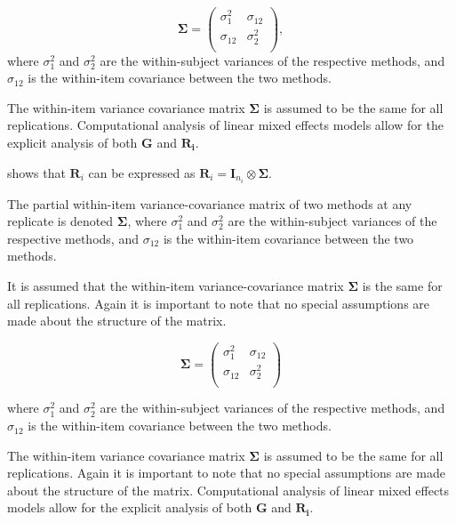 \documentclass[12pt, a4paper]{report}
\theoremstyle{plain}
\theoremstyle{definition}
\theoremstyle{remark}
\begin{document}
\[
\boldsymbol{\Sigma} = \left( \begin{array}{cc}
\sigma^2_{1} & \sigma_{12} \\
\sigma_{12} & \sigma^2_{2} \\
\end{array}\right),
\]
where $\sigma^2_{1}$ and $\sigma^2_{2}$ are the within-subject variances of the respective methods, and $\sigma_{12}$ is the within-item covariance between the two methods. 

The within-item variance covariance matrix $\boldsymbol{\Sigma}$ is assumed to be the same for all replications. Computational analysis of linear mixed effects models allow for the explicit analysis of both $\boldsymbol{G}$ and $\boldsymbol{R_i}$.


\citet{hamlett} shows that $\boldsymbol{R}_{i}$  can be expressed as $\boldsymbol{R}_{i} = \boldsymbol{I}_{n_{i}} \otimes \boldsymbol{\Sigma}$. 

The partial within-item variance-covariance matrix of two methods at any replicate is denoted $\boldsymbol{\Sigma}$, where $\sigma^2_{1}$ and $\sigma^2_{2}$ are the within-subject variances of the respective methods, and $\sigma_{12}$ is the within-item covariance between the two methods. 

It is assumed that the within-item variance-covariance matrix $\boldsymbol{\Sigma}$ is the same for all replications. Again it is important to note that no special assumptions are made about the structure of the matrix.

\begin{equation}
\boldsymbol{\Sigma} = \left( \begin{array}{cc}
\sigma^2_{1} & \sigma_{12} \\
\sigma_{12} & \sigma^2_{2} \\
\end{array}\right)
\end{equation}

where $\sigma^2_{1}$ and $\sigma^2_{2}$ are the within-subject variances of the respective methods, and $\sigma_{12}$ is the within-item covariance between the two methods. 

The within-item variance covariance matrix $\boldsymbol{\Sigma}$ is assumed to be the same for all replications.  Again it is important to note that no special assumptions are made about the structure of the matrix. Computational analysis of linear mixed effects models allow for the explicit analysis of both $\boldsymbol{G}$ and $\boldsymbol{R_i}$.
\end{document}
